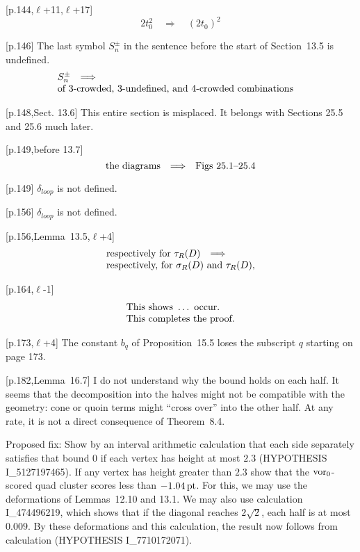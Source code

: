 \documentclass[11pt]{amsart}
\def\op#1{{\text{#1}}}
\def\to{{\quad\Longrightarrow\quad}}
\def\line{$\ell$}
\def\text{\hbox}
\begin{document}
[p.144,\line+11,\line+17]
	$$2t_0^2 \to (2t_0)^2
	$$


[p.146] The last symbol $S_n^\pm$ in the
sentence before the start of 
Section~13.5 is undefined.
	$$\begin{array}{lll}
	S_n^\pm \to&\\
	\text{of 3-crowded, 3-undefined, and
	4-crowded combinations} 
	\end{array}
	$$
	
[p.148,Sect. 13.6]  This entire
section is misplaced.  It belongs with
Sections 25.5 and 25.6 much later.

[p.149,before 13.7]
	$$
	\text{the diagrams}\to
	\text{Figs~25.1--25.4}
	$$
	
[p.149] $\delta_{loop}$ is not defined.

[p.156] $\delta_{loop}$ is not defined.

[p.156,Lemma~13.5,\line+4]
	$$
	\begin{array}{lll}
	\text{respectively for }\tau_R(D)\to\\
	\text{respectively, for }\sigma_R(D) \text{ and }
	\tau_R(D),  
	\end{array}
	$$
	
[p.164,\line-1] 
	$$
	\begin{array}{lll}
	\text{This shows }\ldots \text{ occur.}\\
	\text{This completes the proof.}
	\end{array}
	$$

[p.173,\line+4] The constant $b_q$ of Proposition~15.5 loses the
subscript $q$ starting on page 173.

	
[p.182,Lemma~16.7]  I do not understand why
the bound holds on each half.  It seems that
the decomposition into the halves might not be
compatible with the geometry: cone or quoin
terms might ``cross over'' into the other half.
At any rate, it is not a direct consequence
of Theorem~8.4.

Proposed fix: Show by an interval arithmetic
calculation that each side separately satisfies
that bound $0$ if each vertex has height at most $2.3$ (HYPOTHESIS I\_5127197465).
If any vertex has height greater than $2.3$ show that the $\op{vor}_0$-scored quad cluster scores
less than $-1.04\,\op{pt}$.  For this, we may use the deformations of Lemmas~12.10 and 13.1.  We may also use calculation I\_474496219, which shows that if the diagonal reaches $2\sqrt2$, each half is at most $0.009$.  By these deformations and this calculation, the result now follows from calculation (HYPOTHESIS I\_7710172071).
\end{document}

